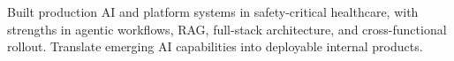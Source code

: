 \documentclass[10pt,a4paper,ragged2e,withhyper]{altacv}
\begin{document}



\makecvheader

\small Built production AI and platform systems in safety-critical healthcare, with strengths in agentic workflows, RAG, full-stack architecture, and cross-functional rollout. Translate emerging AI capabilities into deployable internal products.

\medskip
{}
\end{document}
